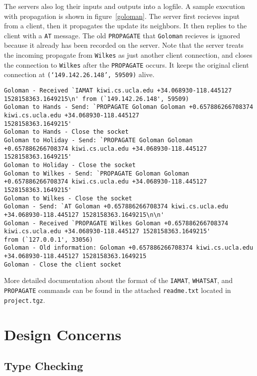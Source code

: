 \documentclass[letterpaper,twocolumn,10pt]{article}
\begin{document}
The servers also log their inputs and outputs into a logfile. A sample execution with propagation is shown in figure~\ref{goloman}.
The server first recieves input from a client, then it propagates the update its neighbors. It then replies to the client with a \texttt{AT}
message. The old \texttt{PROPAGATE} that \texttt{Goloman} recieves is ignored because it already has been recorded on the server.
Note that the server treats the incoming propagate from \texttt{Wilkes} as just another client connection, and closes the connection
to \texttt{Wilkes} after the \texttt{PROPAGATE} occurs. It keeps the original client connection at \texttt{(`149.142.26.148', 59509)} alive.

\begin{figure*}[!ht]
{\scriptsize
\begin{verbatim}
Goloman - Received `IAMAT kiwi.cs.ucla.edu +34.068930-118.445127 1528158363.1649215\n' from (`149.142.26.148', 59509)
Goloman to Hands - Send: `PROPAGATE Goloman Goloman +0.657886266708374 kiwi.cs.ucla.edu +34.068930-118.445127
1528158363.1649215'
Goloman to Hands - Close the socket
Goloman to Holiday - Send: `PROPAGATE Goloman Goloman +0.657886266708374 kiwi.cs.ucla.edu +34.068930-118.445127
1528158363.1649215'
Goloman to Holiday - Close the socket
Goloman to Wilkes - Send: `PROPAGATE Goloman Goloman +0.657886266708374 kiwi.cs.ucla.edu +34.068930-118.445127
1528158363.1649215'
Goloman to Wilkes - Close the socket
Goloman - Send: `AT Goloman +0.657886266708374 kiwi.cs.ucla.edu +34.068930-118.445127 1528158363.1649215\n\n'
Goloman - Received `PROPAGATE Wilkes Goloman +0.657886266708374 kiwi.cs.ucla.edu +34.068930-118.445127 1528158363.1649215'
from (`127.0.0.1', 33056)
Goloman - Old information: Goloman +0.657886266708374 kiwi.cs.ucla.edu +34.068930-118.445127 1528158363.1649215
Goloman - Close the client socket
\end{verbatim}
}
\caption{The log for \texttt{Goloman}.}
\label{goloman}
\end{figure*}

More detailed documentation about the format of the \texttt{IAMAT}, \texttt{WHATSAT}, and \texttt{PROPAGATE} commands can be found in the
attached \texttt{readme.txt} located in \texttt{project.tgz}.

\section{Design Concerns}

\subsection{Type Checking}
\end{document}
